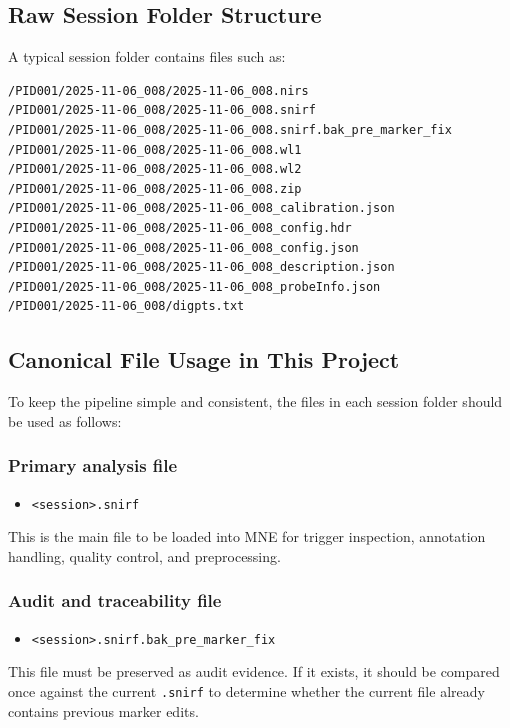 \documentclass[11pt]{article}
\begin{document}
\subsection{Raw Session Folder Structure}
A typical session folder contains files such as:
\begin{verbatim}
/PID001/2025-11-06_008/2025-11-06_008.nirs
/PID001/2025-11-06_008/2025-11-06_008.snirf
/PID001/2025-11-06_008/2025-11-06_008.snirf.bak_pre_marker_fix
/PID001/2025-11-06_008/2025-11-06_008.wl1
/PID001/2025-11-06_008/2025-11-06_008.wl2
/PID001/2025-11-06_008/2025-11-06_008.zip
/PID001/2025-11-06_008/2025-11-06_008_calibration.json
/PID001/2025-11-06_008/2025-11-06_008_config.hdr
/PID001/2025-11-06_008/2025-11-06_008_config.json
/PID001/2025-11-06_008/2025-11-06_008_description.json
/PID001/2025-11-06_008/2025-11-06_008_probeInfo.json
/PID001/2025-11-06_008/digpts.txt
\end{verbatim}

\subsection{Canonical File Usage in This Project}
To keep the pipeline simple and consistent, the files in each session folder should be used as follows:

\subsubsection*{Primary analysis file}
\begin{itemize}
    \item \texttt{<session>.snirf}
\end{itemize}

This is the main file to be loaded into MNE for trigger inspection, annotation handling,
quality control, and preprocessing.

\subsubsection*{Audit and traceability file}
\begin{itemize}
    \item \texttt{<session>.snirf.bak\_pre\_marker\_fix}
\end{itemize}

This file must be preserved as audit evidence.
If it exists, it should be compared once against the current \texttt{.snirf} to determine whether
the current file already contains previous marker edits.
\end{document}
